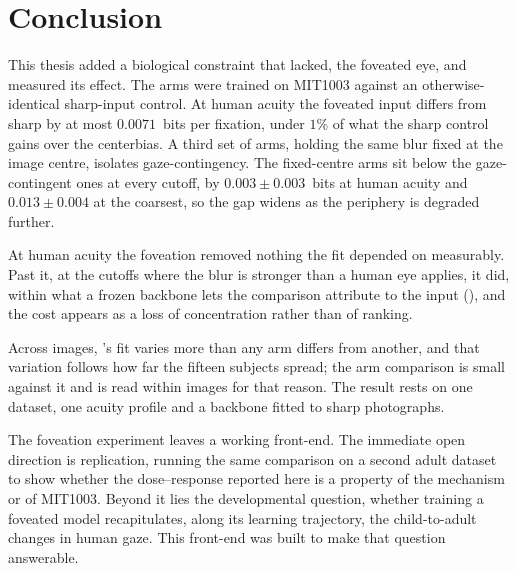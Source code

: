 \chapter{Conclusion}
\label{ch:conclusion}

This thesis added a biological constraint that \dg{} lacked, the foveated eye, and measured
its effect.
The arms were trained on MIT1003 against an otherwise-identical sharp-input control. At human acuity
the foveated input differs from sharp by at most $0.0071$~bits per fixation, under $1\%$ of what the
sharp control gains over the centerbias. A third set of arms, holding the
same blur fixed at the image centre, isolates gaze-contingency. The fixed-centre arms sit below the
gaze-contingent ones at every cutoff, by $0.003 \pm 0.003$~bits at human acuity and $0.013 \pm 0.004$ at
the coarsest, so the gap widens as the periphery is degraded further.

At human acuity the foveation removed nothing the fit depended on measurably. Past it, at the cutoffs
where the blur is stronger than a human eye applies, it did, within what a frozen backbone lets the
comparison attribute to the input (), and the cost appears as a loss of concentration
rather than of ranking.

Across images, \dg{}'s fit varies more than any arm differs from another, and that variation follows how
far the fifteen subjects spread; the arm comparison is small against it and is read within images for that
reason. The result rests on one dataset, one acuity profile and a backbone fitted to sharp photographs.

The foveation experiment leaves a working front-end.
The immediate open direction is replication, running the same comparison on a second adult dataset to
show whether the dose--response reported here is a property of the mechanism or of MIT1003. Beyond it
lies the developmental question, whether training a foveated model recapitulates, along its learning
trajectory, the child-to-adult changes in human gaze. This front-end was built to make that question
answerable.
